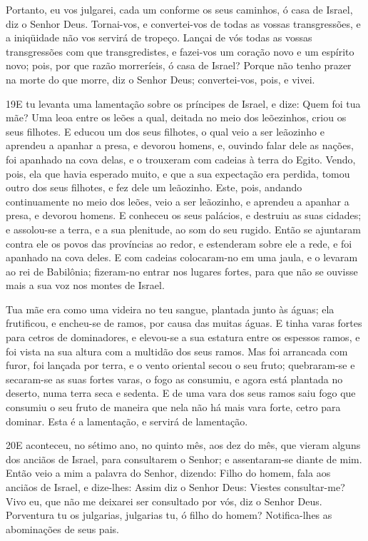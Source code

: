 Portanto, eu vos julgarei, cada um conforme os seus caminhos, ó
casa de Israel, diz o Senhor Deus. Tornai-vos, e convertei-vos de
todas as vossas transgressões, e a iniqüidade não vos servirá de
tropeço. Lançai de vós todas as vossas transgressões com que
transgredistes, e fazei-vos um coração novo e um espírito novo;
pois, por que razão morreríeis, ó casa de Israel? Porque não
tenho prazer na morte do que morre, diz o Senhor Deus;
convertei-vos, pois, e vivei.

\medskip

\lettrine{19} E tu levanta uma lamentação sobre os príncipes
de Israel, e dize: Quem foi tua mãe? Uma leoa entre os leões a
qual, deitada no meio dos leõezinhos, criou os seus filhotes. E
educou um dos seus filhotes, o qual veio a ser leãozinho e aprendeu
a apanhar a presa, e devorou homens, e, ouvindo falar dele as
nações, foi apanhado na cova delas, e o trouxeram com cadeias à
terra do Egito. Vendo, pois, ela que havia esperado muito, e que
a sua expectação era perdida, tomou outro dos seus filhotes, e fez
dele um leãozinho. Este, pois, andando continuamente no meio dos
leões, veio a ser leãozinho, e aprendeu a apanhar a presa, e devorou
homens. E conheceu os seus palácios, e destruiu as suas cidades;
e assolou-se a terra, e a sua plenitude, ao som do seu rugido.
Então se ajuntaram contra ele os povos das províncias ao redor,
e estenderam sobre ele a rede, e foi apanhado na cova deles. E
com cadeias colocaram-no em uma jaula, e o levaram ao rei de
Babilônia; fizeram-no entrar nos lugares fortes, para que não se
ouvisse mais a sua voz nos montes de Israel.

Tua mãe era como uma videira no teu sangue, plantada junto às
águas; ela frutificou, e encheu-se de ramos, por causa das muitas
águas. E tinha varas fortes para cetros de dominadores, e
elevou-se a sua estatura entre os espessos ramos, e foi vista na sua
altura com a multidão dos seus ramos. Mas foi arrancada com
furor, foi lançada por terra, e o vento oriental secou o seu fruto;
quebraram-se e secaram-se as suas fortes varas, o fogo as consumiu,
e agora está plantada no deserto, numa terra seca e sedenta.
E de uma vara dos seus ramos saiu fogo que consumiu o seu
fruto de maneira que nela não há mais vara forte, cetro para
dominar. Esta é a lamentação, e servirá de lamentação.

\medskip

\lettrine{20} E aconteceu, no sétimo ano, no quinto mês, aos
dez do mês, que vieram alguns dos anciãos de Israel, para
consultarem o Senhor; e assentaram-se diante de mim. Então veio
a mim a palavra do Senhor, dizendo: Filho do homem, fala aos
anciãos de Israel, e dize-lhes: Assim diz o Senhor Deus: Viestes
consultar-me? Vivo eu, que não me deixarei ser consultado por vós,
diz o Senhor Deus. Porventura tu os julgarias, julgarias tu, ó
filho do homem? Notifica-lhes as abominações de seus pais.

